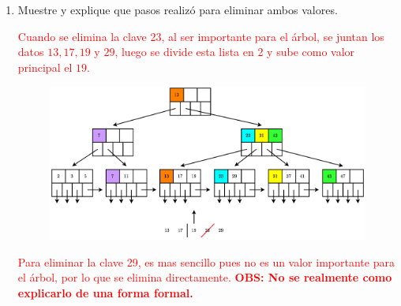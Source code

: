 \documentclass{templateNote}
\begin{document}
\begin{itemize}
\begin{enumerate}
\begin{enumerate}
            \newpage
            \item Muestre y explique que pasos realizó para eliminar ambos valores.
            
            \textcolor{red}{Cuando se elimina la clave 23, al ser importante para el árbol, se juntan los datos $13,17,19$ y $29$, luego se divide esta lista en 2 y sube como valor principal el $19$.
                \begin{figure}[H]
                    \centering
                    \includegraphics[width=\textwidth]{diagram/P3-2-c.png}
                \end{figure}
                Para eliminar la clave 29, es mas sencillo pues no es un valor importante para el árbol, por lo que se elimina directamente.
                \newline
                \textbf{OBS: No se realmente como explicarlo de una forma formal.}
            }
        \end{enumerate}
    \end{enumerate}
\end{itemize}   
\end{document}
